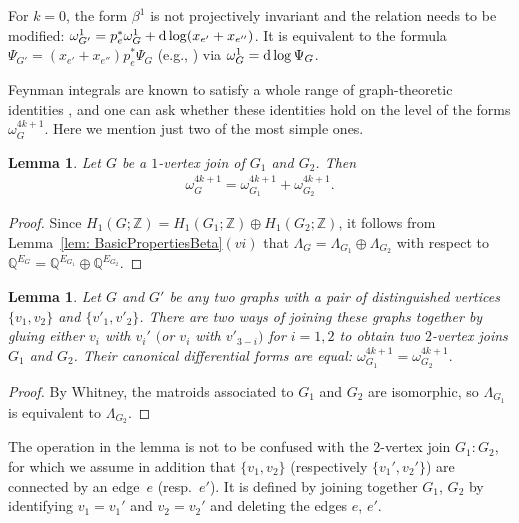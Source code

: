 \documentclass[pdftex]{sigma}%
\newtheorem{lem}[thm]{Lemma}
\numberwithin{equation}{section}
\newcommand{\Z}{\mathbb Z}
\newcommand{\Q}{\mathbb Q}
\newcommand{\0}{\color{blue}{\mathsf{0}}}
\begin{document}
\begin{rem}
For $k=0$, the form $\beta^1$ is not projectively invariant and the relation needs to be modified:
$\omega^1_{G'} = p_e^* \omega^1_{G} + {\rm d}\log(x_{e'}+ x_{e''}) $. It is equivalent to the formula
$\Psi_{G'} = (x_{e'}+x_{e''} ) p_e^* \Psi_G$ (e.g., \cite[Lemma 18]{PeriodsFeynman}) via $\omega^1_G = {\rm d} \log \Psi_G$.
\end{rem}


Feynman integrals are known to satisfy a whole range of graph-theoretic identities \cite{BroadhurstKreimer, PeriodsFeynman, Schnetz}, and one can ask whether these identities hold on the level of the forms $\omega^{4k+1}_G$. Here we mention just two of the most simple ones.
\begin{lem} \label{lem: 1vertexjoin} Let $G$ be a $1$-vertex join of $G_1$ and $G_2$. Then
\begin{gather*}
\omega^{4k+1}_G = \omega^{4k+1}_{G_1} +\omega^{4k+1}_{G_2} .
\end{gather*}
\end{lem}
\begin{proof} Since $H_1(G;\Z) = H_1(G_1;\Z) \oplus H_1(G_2;\Z)$, it follows from Lemma~\ref{lem: BasicPropertiesBeta}$(vi)$ that $\Lambda_G = \Lambda_{G_1} \oplus \Lambda_{G_2}$ with respect to $\Q^{E_G} = \Q^{E_{G_1}} \oplus \Q^{E_{G_2}}$.
\end{proof}

\begin{lem} Let $G$ and $G'$ be any two graphs with a pair of distinguished vertices $\{v_1,v_2\}$ and $\{v'_1,v'_2\}$. There are two ways of joining these graphs together by gluing either $v_i$ with $v_i'$ $($or $v_i$ with $v'_{3-i})$ for $i=1,2$ to obtain two $2$-vertex joins $G_1$ and $G_2$. Their canonical differential forms are equal:
$\omega^{4k+1}_{G_1} = \omega^{4k+1}_{G_2}.$
\end{lem}
\begin{proof} By Whitney, the matroids associated to $G_1$ and $G_2$ are isomorphic, so $\Lambda_{G_1}$ is equivalent to $\Lambda_{G_2}$.
\end{proof}

\begin{rem} \label{rem: 2VJ} The operation in the lemma is not to be confused with the 2-vertex join $G_1: G_2$, for which we assume in addition that $\{v_1,v_2\}$ (respectively $\{v_1',v_2'\}$) are connected by an edge~$e$ (resp.~$e'$). It is defined by joining together $G_1$, $G_2$ by identifying $v_1=v_1'$ and $v_2=v_2'$ and deleting the edges $e$, $e'$.
\end{rem}
\end{document}

